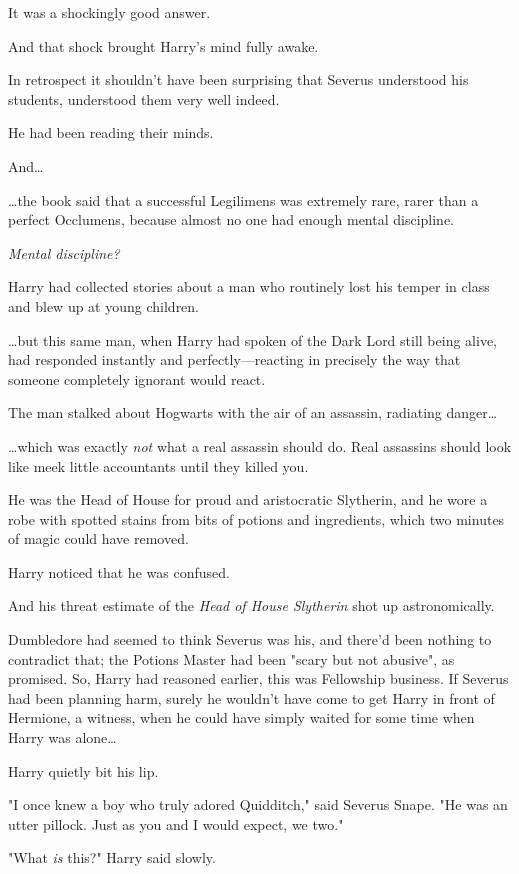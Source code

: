 It was a shockingly good answer.

And that shock brought Harry's mind fully awake.

In retrospect it shouldn't have been surprising that Severus understood his
students, understood them very well indeed.

He had been reading their minds.

And{\ldots}

{\ldots}the book said that a successful Legilimens was extremely rare, rarer
than a perfect Occlumens, because almost no one had enough mental discipline.

\emph{Mental discipline?}

Harry had collected stories about a man who routinely lost his temper in class
and blew up at young children.

{\ldots}but this same man, when Harry had spoken of the Dark Lord still being
alive, had responded instantly and perfectly---reacting in precisely the way
that someone completely ignorant would react.

The man stalked about Hogwarts with the air of an assassin, radiating
danger{\ldots}

{\ldots}which was exactly \emph{not} what a real assassin should do. Real
assassins should look like meek little accountants until they killed you.

He was the Head of House for proud and aristocratic Slytherin, and he wore a
robe with spotted stains from bits of potions and ingredients, which two
minutes of magic could have removed.

Harry noticed that he was confused.

And his threat estimate of the \emph{Head of House Slytherin} shot up
astronomically.

Dumbledore had seemed to think Severus was his, and there'd been nothing to
contradict that; the Potions Master had been "scary but not abusive", as
promised. So, Harry had reasoned earlier, this was Fellowship business. If
Severus had been planning harm, surely he wouldn't have come to get Harry in
front of Hermione, a witness, when he could have simply waited for some time
when Harry was alone{\ldots}

Harry quietly bit his lip.

"I once knew a boy who truly adored Quidditch," said Severus Snape. "He was an
utter pillock. Just as you and I would expect, we two."

"What \emph{is} this?" Harry said slowly.

